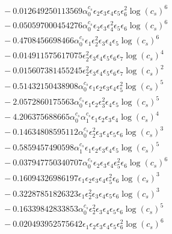 \documentclass[10pt]{article}
\begin{document}
\begin{align*}
&{}  - 0.012649250113569 \alpha_{0}^{c_s} \epsilon_{2} \epsilon_{3} \epsilon_{4} \epsilon_{5} \epsilon_{6}^{2} \log{\left(c_{s} \right)}^{6} \\
&{}  - 0.050597000454276 \alpha_{0}^{c_s} \epsilon_{2} \epsilon_{3} \epsilon_{4}^{2} \epsilon_{5} \epsilon_{6} \log{\left(c_{s} \right)}^{6} \\
&{}  - 0.4708456698466 \alpha_{0}^{c_s} \epsilon_{1} \epsilon_{2}^{2} \epsilon_{3} \epsilon_{4} \epsilon_{5} \log{\left(c_{s} \right)}^{6} \\
&{}  - 0.014911575617075 \epsilon_{2}^{2} \epsilon_{3} \epsilon_{4} \epsilon_{5} \epsilon_{6} \epsilon_{7} \log{\left(c_{s} \right)}^{4} \\
&{}  - 0.015607381455245 \epsilon_{2}^{2} \epsilon_{3} \epsilon_{4} \epsilon_{5} \epsilon_{6} \epsilon_{7} \log{\left(c_{s} \right)}^{2} \\
&{}  - 0.51432150438908 \alpha_{0}^{c_s} \epsilon_{1} \epsilon_{2} \epsilon_{3} \epsilon_{4} \epsilon_{5}^{2} \log{\left(c_{s} \right)}^{5} \\
&{}  - 2.0572860175563 \alpha_{0}^{c_s} \epsilon_{1} \epsilon_{2} \epsilon_{3}^{2} \epsilon_{4} \epsilon_{5} \log{\left(c_{s} \right)}^{5} \\
&{}  - 4.206375688665 \alpha_{0}^{c_s} \alpha_{1}^{c_s} \epsilon_{1} \epsilon_{2} \epsilon_{3} \epsilon_{4} \log{\left(c_{s} \right)}^{4} \\
&{}  - 0.14634808595112 \alpha_{0}^{c_s} \epsilon_{2}^{2} \epsilon_{3} \epsilon_{4} \epsilon_{5} \epsilon_{6} \log{\left(c_{s} \right)}^{3} \\
&{}  - 0.5859457490598 \alpha_{1}^{c_s} \epsilon_{1} \epsilon_{2} \epsilon_{3} \epsilon_{4} \epsilon_{5} \log{\left(c_{s} \right)}^{5} \\
&{}  - 0.037947750340707 \alpha_{0}^{c_s} \epsilon_{2} \epsilon_{3} \epsilon_{4} \epsilon_{5}^{2} \epsilon_{6} \log{\left(c_{s} \right)}^{6} \\
&{}  - 0.16094326986197 \epsilon_{1} \epsilon_{2} \epsilon_{3} \epsilon_{4} \epsilon_{5}^{2} \epsilon_{6} \log{\left(c_{s} \right)}^{3} \\
&{}  - 0.32287851826323 \epsilon_{1} \epsilon_{2}^{2} \epsilon_{3} \epsilon_{4} \epsilon_{5} \epsilon_{6} \log{\left(c_{s} \right)}^{3} \\
&{}  - 0.16339842833853 \alpha_{0}^{c_s} \epsilon_{2}^{2} \epsilon_{3} \epsilon_{4} \epsilon_{5} \epsilon_{6} \log{\left(c_{s} \right)}^{5} \\
&{}  - 0.020493952575642 \epsilon_{1} \epsilon_{2} \epsilon_{3} \epsilon_{4} \epsilon_{5} \epsilon_{6}^{2} \log{\left(c_{s} \right)}^{6} \\

\end{align*}
\end{document}
